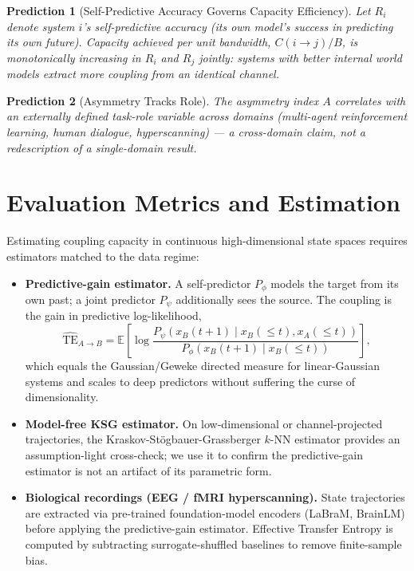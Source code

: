 \documentclass[11pt]{article}
\newtheorem{prediction}{Prediction}
\begin{document}
\begin{prediction}[Self-Predictive Accuracy Governs Capacity Efficiency]
Let $R_i$ denote system $i$'s self-predictive accuracy (its own model's success in predicting its own future). Capacity achieved per unit bandwidth, $C(i \to j)/B$, is monotonically increasing in $R_i$ and $R_j$ jointly: systems with better internal world models extract more coupling from an identical channel.
\end{prediction}

\begin{prediction}[Asymmetry Tracks Role]
The asymmetry index $A$ correlates with an externally defined task-role variable across domains (multi-agent reinforcement learning, human dialogue, hyperscanning) --- a cross-domain claim, not a redescription of a single-domain result.
\end{prediction}

\section{Evaluation Metrics and Estimation}
\label{sec:estimation}

Estimating coupling capacity in continuous high-dimensional state spaces requires estimators matched to the data regime:
\begin{itemize}[leftmargin=1.2em]
    \item \textbf{Predictive-gain estimator.} A self-predictor $P_\phi$ models the target from its own past; a joint predictor $P_\psi$ additionally sees the source. The coupling is the gain in predictive log-likelihood,
    $$\hat{\mathrm{TE}}_{A \to B} = \mathbb{E}\!\left[\log \frac{P_\psi(x_B(t{+}1)\mid x_B(\le t), x_A(\le t))}{P_\phi(x_B(t{+}1)\mid x_B(\le t))}\right],$$
    which equals the Gaussian/Geweke directed measure for linear-Gaussian systems and scales to deep predictors without suffering the curse of dimensionality.
    \item \textbf{Model-free KSG estimator.} On low-dimensional or channel-projected trajectories, the Kraskov-St\"ogbauer-Grassberger $k$-NN estimator provides an assumption-light cross-check; we use it to confirm the predictive-gain estimator is not an artifact of its parametric form.
    \item \textbf{Biological recordings (EEG / fMRI hyperscanning).} State trajectories are extracted via pre-trained foundation-model encoders (LaBraM, BrainLM) before applying the predictive-gain estimator. Effective Transfer Entropy is computed by subtracting surrogate-shuffled baselines to remove finite-sample bias.
\end{itemize}
\end{document}
